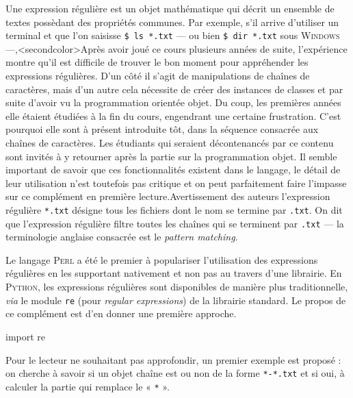 Une expression régulière est un objet mathématique qui décrit un ensemble de textes possèdant des propriétés communes. Par exemple, s'il arrive d'utiliser un terminal et que l'on saisisse \texttt{\$ ls *.txt} --- ou bien \texttt{\$ dir *.txt} sous \textsc{Windows} ---,\caution[t]<secondcolor>{Après avoir joué ce cours plusieurs années de suite, l'expérience montre qu'il est difficile de trouver le bon moment pour appréhender les expressions régulières.
D'un côté il s'agit de manipulations de chaînes de caractères, mais d'un autre cela nécessite de créer des instances de classes et par suite d'avoir vu la programmation orientée objet. Du coup, les premières années elle étaient étudiées à la fin du cours, engendrant une certaine frustration.
C'est pourquoi elle sont à présent introduite tôt, dans la séquence consacrée aux chaînes de caractères. Les étudiants qui seraient décontenancés par ce contenu sont invités à y retourner après la partie sur la programmation objet.
Il semble important de savoir que ces fonctionnalités existent dans le langage, le détail de leur utilisation n'est toutefois pas critique et on peut parfaitement faire l'impasse sur ce complément en première lecture.}{Avertissement des auteurs}
 l'expression régulière \texttt{*.txt} désigne tous les fichiers dont le nom se termine par \texttt{.txt}. On dit que l'expression régulière filtre toutes les chaînes qui se terminent par \texttt{.txt} --- la terminologie anglaise consacrée est le \textit{pattern matching}.

Le langage \textsc{Perl} a été le premier à populariser l'utilisation des expressions régulières en les supportant nativement et non pas au travers d'une librairie. En \textsc{Python}, les expressions régulières sont disponibles de manière plus traditionnelle, \textit{via} le module \texttt{re} (pour \textit{regular expressions}) de la librairie standard. Le propos de ce complément est d'en donner une première approche.

\begin{idleconsole}
	\begin{pyconsole}
		import re
	\end{pyconsole}
\end{idleconsole}

\vspace{1pt}%


Pour le lecteur ne souhaitant pas approfondir, un premier exemple est proposé : on cherche à savoir si un objet chaîne est ou non de la forme \texttt{*-*.txt} et si oui, à calculer la partie qui remplace le « \texttt{*} ».

